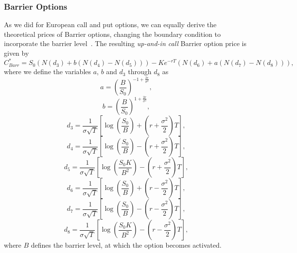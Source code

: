 \subsubsection{Barrier Options}
As we did for European call and put options, we can equally derive the theoretical prices of Barrier options, changing the boundary condition to incorporate the barrier level~\citep{taleb}. The resulting \emph{up-and-in call} Barrier option price is given by
\begin{equation}\label{barr1}
C_{Barr}^*=S_0\left(N(d_3)+b\left(N(d_4)-N(d_5)\right)\right)-Ke^{-rT}\left(N(d_6)+a\left(N(d_7)-N(d_8)\right)\right),
\end{equation}
\noindent where we define the variables $a$, $b$ and $d_3$ through $d_8$ as
\begin{equation}
a=\left(\frac{B}{S_0}\right)^{-1+\frac{2r}{\sigma^2}},
\end{equation}
\begin{equation}
b=\left(\frac{B}{S_0}\right)^{1+\frac{2r}{\sigma^2}},
\end{equation}
\begin{equation}
d_3=\frac{1}{\sigma\sqrt{T}}\left[\log\left(\frac{S_0}{B}\right)+\left(r+\frac{\sigma^2}{2}\right)T\right],
\end{equation}
\begin{equation}
d_4=\frac{1}{\sigma\sqrt{T}}\left[\log\left(\frac{S_0}{B}\right)-\left(r+\frac{\sigma^2}{2}\right)T\right],
\end{equation}
\begin{equation}
d_5=\frac{1}{\sigma\sqrt{T}}\left[\log\left(\frac{S_0K}{B^2}\right)-\left(r+\frac{\sigma^2}{2}\right)T\right],
\end{equation}
\begin{equation}
d_6=\frac{1}{\sigma\sqrt{T}}\left[\log\left(\frac{S_0}{B}\right)+\left(r-\frac{\sigma^2}{2}\right)T\right],
\end{equation}
\begin{equation}
d_7=\frac{1}{\sigma\sqrt{T}}\left[\log\left(\frac{S_0}{B}\right)-\left(r-\frac{\sigma^2}{2}\right)T\right],
\end{equation}
\begin{equation}
d_8=\frac{1}{\sigma\sqrt{T}}\left[\log\left(\frac{S_0K}{B^2}\right)-\left(r-\frac{\sigma^2}{2}\right)T\right],
\end{equation}
\noindent where $B$ defines the barrier level, at which the option becomes activated.


